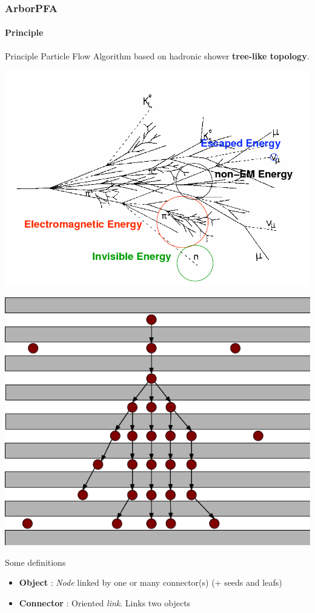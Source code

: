 \documentclass[8pt]{beamer}
\begin{document}
  \begin{frame}
  \frametitle{ArborPFA}
  \framesubtitle{Principle}
    \begin{block}{Principle}
      Particle Flow Algorithm based on hadronic shower \textbf{tree-like topology}.
    \end{block}
    \pause
    \begin{minipage}{0.48\linewidth}
      \begin{center}
        \includegraphics[width=0.8\linewidth]{hadronic_shower.png}      
      \end{center}
    \end{minipage} \hfill
    \begin{minipage}{0.48\linewidth}
      \begin{center}
        \includegraphics[angle=90, width=0.5\linewidth]{ArborSchema.png}        
      \end{center}
    \end{minipage}
    \pause
    \begin{block}{Some definitions}
      \begin{itemize}
        \item \textbf{Object} : \textit{Node} linked by one or many connector(s) (+ seeds and leafs)
        \item \textbf{Connector} : Oriented \textit{link}. Links two objects

\end{itemize}
\end{block}
\end{frame}
\end{document}

